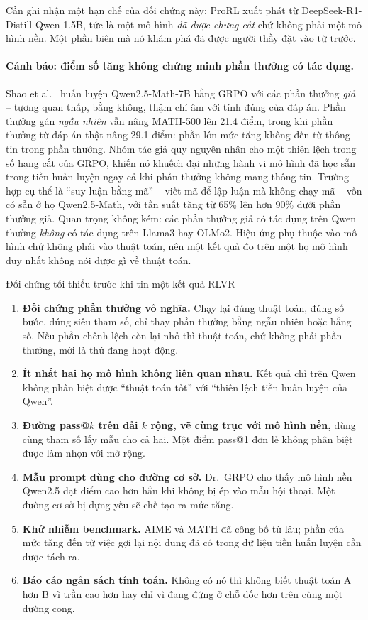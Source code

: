 Cần ghi nhận một hạn chế của đối chứng này: ProRL xuất phát từ DeepSeek-R1-Distill-Qwen-1.5B, tức là một mô hình \emph{đã được chưng cất} chứ không phải một mô hình nền. Một phần biên mà nó khám phá đã được người thầy đặt vào từ trước.

\paragraph{Cảnh báo: điểm số tăng không chứng minh phần thưởng có tác dụng.}
Shao et al.~\cite{shao2025spurious} huấn luyện Qwen2.5-Math-7B bằng GRPO với các phần thưởng \emph{giả} -- tương quan thấp, bằng không, thậm chí âm với tính đúng của đáp án. Phần thưởng gán \emph{ngẫu nhiên} vẫn nâng MATH-500 lên 21.4 điểm, trong khi phần thưởng từ đáp án thật nâng 29.1 điểm: phần lớn mức tăng không đến từ thông tin trong phần thưởng. Nhóm tác giả quy nguyên nhân cho một thiên lệch trong số hạng cắt của GRPO, khiến nó khuếch đại những hành vi mô hình đã học sẵn trong tiền huấn luyện ngay cả khi phần thưởng không mang thông tin. Trường hợp cụ thể là ``suy luận bằng mã'' -- viết mã để lập luận mà không chạy mã -- vốn có sẵn ở họ Qwen2.5-Math, với tần suất tăng từ 65\% lên hơn 90\% dưới phần thưởng giả. Quan trọng không kém: các phần thưởng giả có tác dụng trên Qwen thường \emph{không} có tác dụng trên Llama3 hay OLMo2. Hiệu ứng phụ thuộc vào mô hình chứ không phải vào thuật toán, nên một kết quả đo trên một họ mô hình duy nhất không nói được gì về thuật toán.

\begin{checklist}{Đối chứng tối thiểu trước khi tin một kết quả RLVR}
\begin{enumerate}
	\item \textbf{Đối chứng phần thưởng vô nghĩa.} Chạy lại đúng thuật toán, đúng số bước, đúng siêu tham số, chỉ thay phần thưởng bằng ngẫu nhiên hoặc hằng số. Nếu phần chênh lệch còn lại nhỏ thì thuật toán, chứ không phải phần thưởng, mới là thứ đang hoạt động.
	\item \textbf{Ít nhất hai họ mô hình không liên quan nhau.} Kết quả chỉ trên Qwen không phân biệt được ``thuật toán tốt'' với ``thiên lệch tiền huấn luyện của Qwen''.
	\item \textbf{Đường pass@$k$ trên dải $k$ rộng, vẽ cùng trục với mô hình nền,} dùng cùng tham số lấy mẫu cho cả hai. Một điểm pass@1 đơn lẻ không phân biệt được làm nhọn với mở rộng.
	\item \textbf{Mẫu prompt dùng cho đường cơ sở.} Dr.~GRPO cho thấy mô hình nền Qwen2.5 đạt điểm cao hơn hẳn khi không bị ép vào mẫu hội thoại. Một đường cơ sở bị dựng yếu sẽ chế tạo ra mức tăng.
	\item \textbf{Khử nhiễm benchmark.} AIME và MATH đã công bố từ lâu; phần của mức tăng đến từ việc gợi lại nội dung đã có trong dữ liệu tiền huấn luyện cần được tách ra.
	\item \textbf{Báo cáo ngân sách tính toán.} Không có nó thì không biết thuật toán A hơn B vì trần cao hơn hay chỉ vì đang đứng ở chỗ dốc hơn trên cùng một đường cong.
\end{enumerate}
\end{checklist}

